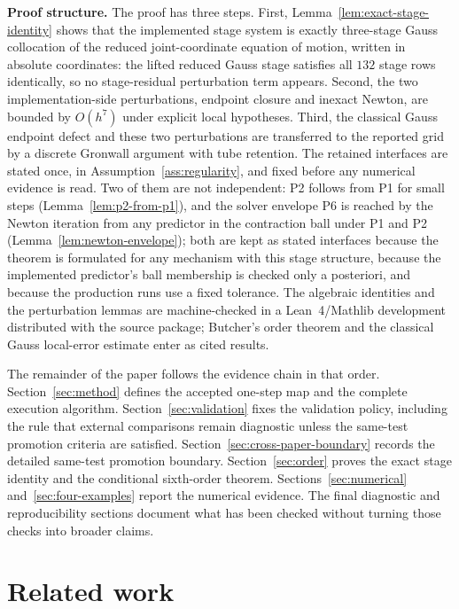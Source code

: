 \documentclass[preprint,12pt]{elsarticle}
\begin{document}
\noindent\textbf{Proof structure.}
The proof has three steps. First, Lemma~\ref{lem:exact-stage-identity} shows
that the implemented stage system is exactly three-stage Gauss collocation of
the reduced joint-coordinate equation of motion, written in absolute
coordinates: the lifted reduced Gauss stage satisfies all $132$ stage rows
identically, so no stage-residual perturbation term appears. Second, the two
implementation-side perturbations, endpoint closure and inexact Newton, are
bounded by \(O(h^7)\) under explicit local hypotheses. Third, the classical
Gauss endpoint defect and these two perturbations are transferred to the
reported grid by a discrete Gronwall argument with tube retention. The
retained interfaces are stated once, in Assumption~\ref{ass:regularity}, and
fixed before any numerical evidence is read. Two of them are not independent:
P2 follows from P1 for small steps (Lemma~\ref{lem:p2-from-p1}), and the
solver envelope P6 is reached by the Newton iteration from any predictor in
the contraction ball under P1 and P2 (Lemma~\ref{lem:newton-envelope}); both
are kept as stated interfaces because the theorem is formulated for any
mechanism with this stage structure, because the implemented predictor's
ball membership is checked only a posteriori, and because the production
runs use a fixed tolerance. The algebraic identities and the
perturbation lemmas are machine-checked in a Lean~4/Mathlib development
distributed with the source package; Butcher's order theorem and the classical
Gauss local-error estimate enter as cited results.

The remainder of the paper follows the evidence chain in that order.
Section~\ref{sec:method} defines the accepted one-step map and the complete
execution algorithm. Section~\ref{sec:validation} fixes the validation
policy, including the rule that external comparisons remain diagnostic unless
the same-test promotion criteria are satisfied.
Section~\ref{sec:cross-paper-boundary}
records the detailed same-test promotion boundary.
Section~\ref{sec:order} proves the exact stage identity and the conditional
sixth-order theorem. Sections~\ref{sec:numerical}
and~\ref{sec:four-examples} report the numerical evidence. The final
diagnostic and reproducibility sections document what has been checked without
turning those checks into broader claims.

\section{Related work}
\end{document}

